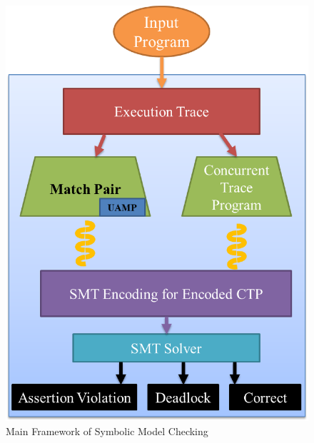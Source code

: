 \begin{figure}[h]
\centering
\includegraphics[scale=0.35]{fig/FD.eps}
\caption{Main Framework of Symbolic Model Checking}
\label{fig:framework}
\end{figure}

